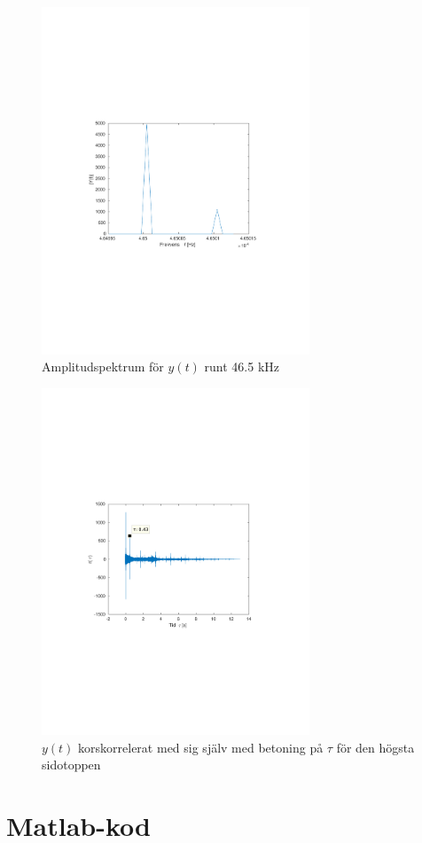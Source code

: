 \documentclass[10pt,twocolumn]{article}
\begin{document}
\section*{ }
\begin{figure}[H]
\includegraphics[trim={3.8cm 8cm 4.8cm 9cm},clip,width=8cm]{Y_46_5kHz.pdf}
\caption{Amplitudspektrum för $y(t)$ runt 46.5 kHz}
\end{figure}

\begin{figure}[H]
\includegraphics[trim={3.8cm 8cm 4.8cm 9cm},clip,width=8cm]{xcorr.pdf}
\caption{$y(t)$ korskorrelerat med sig själv med betoning på $\tau$ för den högsta sidotoppen}
\end{figure}

\clearpage

\section*{Matlab-kod}
\small
\texttt{}
\end{document}
